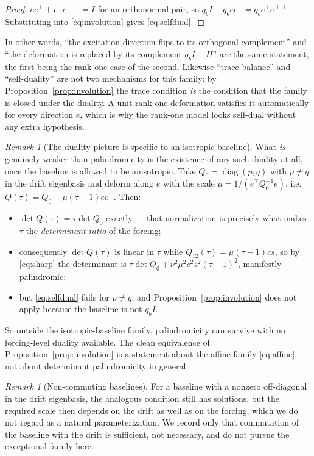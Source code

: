 \documentclass[11pt]{article}
\theoremstyle{plain}
\theoremstyle{definition}
\theoremstyle{remark}
\newtheorem{remark}[theorem]{Remark}
\newcommand{\eperp}{e^{\perp}}
\newcommand{\eperpT}{e^{\perp\!\top}}
\newcommand{\T}{^{\!\top}}
\begin{document}
\begin{proof}
$ee\T+\eperp\eperpT=I$ for an orthonormal pair, so $q_bI-q_bee\T=q_b\eperp\eperpT$. Substituting
into \eqref{eq:involution} gives \eqref{eq:selfdual}.
\end{proof}

In other words, ``the excitation direction flips to its orthogonal complement'' and ``the
deformation is replaced by its complement $q_bI-H$'' are the same statement, the first being the
rank-one case of the second. Likewise ``trace balance'' and ``self-duality'' are not two
mechanisms for this family: by Proposition~\ref{prop:involution} the trace condition
\emph{is} the condition that the family is closed under the duality. A unit rank-one deformation
satisfies it automatically for every direction $e$, which is why the rank-one model looks
self-dual without any extra hypothesis.

\begin{remark}[The duality picture is specific to an isotropic baseline]\label{rem:selfdualnotnec}
What \emph{is} genuinely weaker than palindromicity is the existence of any such duality at all,
once the baseline is allowed to be anisotropic. Take $Q_0=\operatorname{diag}(p,q)$ with $p\neq q$
in the drift eigenbasis and deform along $e$ with the scale $\mu=1/(e\T Q_0^{-1}e)$, i.e.\
$Q(\tau)=Q_0+\mu(\tau-1)ee\T$. Then:
\begin{itemize}\itemsep2pt
\item $\det Q(\tau)=\tau\det Q_0$ exactly --- that normalization is precisely what makes $\tau$
  the \emph{determinant ratio} of the forcing;
\item consequently $\det Q(\tau)$ is linear in $\tau$ while $Q_{12}(\tau)=\mu(\tau-1)cs$, so by
  \eqref{eq:sharp} the determinant is $\tau\det Q_0+\nu^2\mu^2c^2s^2(\tau-1)^2$, manifestly
  palindromic;
\item but \eqref{eq:selfdual} fails for $p\neq q$, and Proposition~\ref{prop:involution} does not
  apply because the baseline is not $q_bI$.
\end{itemize}
So outside the isotropic-baseline family, palindromicity can survive with no forcing-level
duality available. The clean equivalence of Proposition~\ref{prop:involution} is a statement
about the affine family \eqref{eq:affine}, not about determinant palindromicity in general.
\end{remark}

\begin{remark}[Non-commuting baselines]\label{rem:noncommuting}
For a baseline with a nonzero off-diagonal in the drift eigenbasis, the analogous condition
still has solutions, but the required scale then depends on the drift as well as on the
forcing, which we do not regard as a natural parameterization. We record only that commutation
of the baseline with the drift is sufficient, not necessary, and do not pursue the exceptional
family here.
\end{remark}
\end{document}
